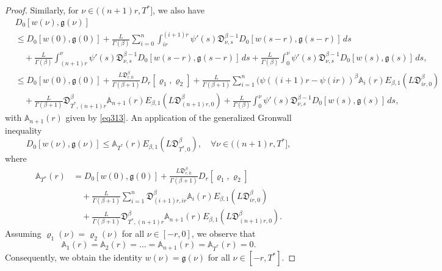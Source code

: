 \documentclass[reqno]{amsart}
\begin{document}
\begin{proof}
 Similarly, for $\nu \in((n+1) r, T^{*}]$, we also have
\begin{align*}
&D_0[ w(\nu ), \mathfrak{g}(\nu )] \\
&\leq  D_0[ w(0), \mathfrak{g}(0)]+\frac{ L}{\Gamma(\beta)} \sum_{i=0}^{n}
  \int_{i r}^{(i+1) r} \psi'(s)\mathfrak{D}_{\nu ,s}^{\beta-1} D_0[ w(s- r), 
  \mathfrak{g}(s- r)]\,ds \\
&\quad +\frac{ L}{\Gamma(\beta)} \int_{(n+1) r}^{\nu } 
 \psi'(s)\mathfrak{D}_{\nu ,s}^{\beta-1} D_0[ w(s- r), \mathfrak{g}(s- r)]\,ds 
 +\frac{ L}{\Gamma(\beta)} \int_0^{\nu } \psi'(s)\mathfrak{D}_{\nu ,s}^{\beta-1} D_0[ w(s), \mathfrak{g}(s)]\,ds, \\
&\leq  D_0[ w(0), \mathfrak{g}(0)]+\frac{ L\mathfrak{D}_{ r,0}^{\beta}}{\Gamma(\beta+1)}
 D_{ r}[\varrho_{1}, \varrho_{2}] 
+\frac{ L}{\Gamma(\beta+1)} \sum_{i=1}^{n}(\psi((i+1) r-\psi(i r))^{\beta} \mathbb{A}_{i}( r) E_{\beta, 1}( L\mathfrak{D}_{i r,0}^{\beta}) \\
&\quad +\frac{ L}{\Gamma(\beta+1)}\mathfrak{D}_{T^{*},(n+1) r}^{\beta} \mathbb{A}_{n+1}
 ( r) E_{\beta, 1}( L\mathfrak{D}_{(n+1) r,0}^{\beta}) 
 +\frac{ L}{\Gamma(\beta)} \int_0^{\nu } \psi'(s)\mathfrak{D}_{\nu ,s}^{\beta-1} D_0[ w(s), \mathfrak{g}(s)]\,ds,
\end{align*}
with $\mathbb{A}_{n+1}( r)$ given by \eqref{eq313}. An application of the generalized 
Gronwall inequality
\begin{equation}\label{ineq314}
D_0[ w(\nu ), \mathfrak{g}(\nu )] \leq \mathbb{A}_{T^{*}}( r)
 E_{\beta, 1}( L\mathfrak{D}_{T^{*},0}^{\beta}), \quad 
 \forall \nu \in((n+1) r, T^{*}], 
\end{equation}
where
\begin{align*}
\mathbb{A}_{T^{*}}( r)
&=  D_0[ w(0), \mathfrak{g}(0)]
 +\frac{ L\mathfrak{D}_{ r,0}^{\beta}}{\Gamma(\beta+1)} 
 D_{ r}[\varrho_{1}, \varrho_{2}] \\
&\quad+\frac{ L}{\Gamma(\beta+1)} \sum_{i=1}^{n}\mathfrak{D}_{(i+1) r,i r}^{\beta} 
 \mathbb{A}_{i}( r) E_{\beta, 1}( L\mathfrak{D}_{i r,0}^{\beta}) \\
&\quad +\frac{ L}{\Gamma(\beta+1)}\mathfrak{D}_{T^{*},(n+1) r}^{\beta} 
 \mathbb{A}_{n+1}( r) E_{\beta, 1}( L\mathfrak{D}_{(n+1) r,0}^{\beta}) .
\end{align*}
Assuming $\varrho_1(\nu ) = \varrho_2(\nu )$ for all $\nu \in [- r, 0]$,
 we observe that
\[
\mathbb{A}_1( r) = \mathbb{A}_2( r) = \dots 
= \mathbb{A}_{n+1}( r) = \mathbb{A}_{T^*}( r) = 0.
\]
Consequently, we obtain the identity $ w(\nu ) = \mathfrak{g}(\nu )$ for all 
$\nu \in [- r, T^*]$.
\end{proof}
\end{document}
